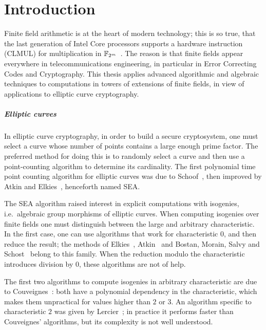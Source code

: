 

\chapter[Intoduction (English)][Introduction]{Introduction}

  Finite field arithmetic is
at the heart of modern technology; this is so true, that the last
generation of Intel Core processors supports a hardware instruction
(CLMUL) for multiplication in $\mathbb{F}_{2^m}$~\cite{intel-carryless}. The
reason is that finite fields appear everywhere in telecommunications
engineering, in particular in Error Correcting Codes and
Cryptography. This thesis applies advanced algorithmic and algebraic
techniques to computations in towers of extensions of finite fields,
in view of applications to elliptic curve cryptography.


\paragraph*{Elliptic curves}
In elliptic curve cryptography, in order to build a secure
cryptosystem, one must select a curve whose number of points contains
a large enough prime factor. The preferred method for doing this is to
randomly select a curve and then use a point-counting algorithm to
determine its cardinality. The first polynomial time point counting
algorithm for elliptic curves was due to Schoof~\cite{schoof85}, then
improved by Atkin and Elkies~\cite{atkin88,elkies98,schoof95},
henceforth named SEA.

The SEA algorithm raised interest in explicit computations with
isogenies, i.e.\ algebraic group morphisms of elliptic curves. When
computing isogenies over finite fields one must distinguish between
the large and arbitrary characteristic. In the first case, one can use
algorithms that work for characteristic $0$, and then reduce the
result; the methods of Elkies~\cite{elkies98,morain95},
Atkin~\cite{schoof95} and Bostan, Morain, Salvy and
Schost~\cite{bostan+morain+salvy+schost08} belong to this family. When
the reduction modulo the characteristic introduces division by $0$,
these algorithms are not of help.

The first two algorithms to compute isogenies in arbitrary
characteristic are due to Couveignes~\cite{couveignes94,couveignes96}:
both have a polynomial dependency in the characteristic, which makes
them unpractical for values higher than $2$ or $3$. An algorithm
specific to characteristic $2$ was given by Lercier~\cite{lercier96};
in practice it performs faster than Couveignes' algorithms, but its
complexity is not well understood. 

